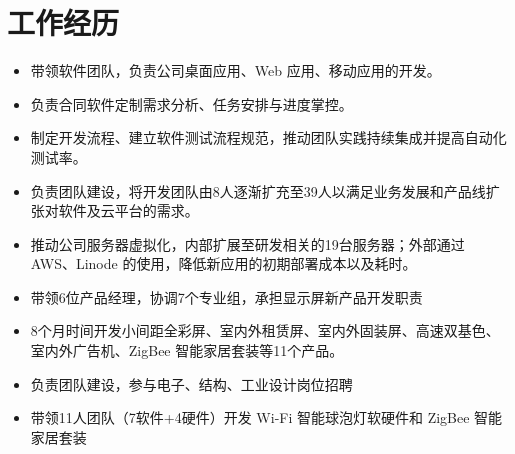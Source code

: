 \documentclass[11pt,a4paper]{moderncv/moderncv}
\begin{document}
\maketitle


\section{工作经历}

{
\begin{itemize}
	\item 带领软件团队，负责公司桌面应用、Web 应用、移动应用的开发。
	\item 负责合同软件定制需求分析、任务安排与进度掌控。
	\item 制定开发流程、建立软件测试流程规范，推动团队实践持续集成并提高自动化测试率。
	\item 负责团队建设，将开发团队由8人逐渐扩充至39人以满足业务发展和产品线扩张对软件及云平台的需求。
	\item 推动公司服务器虚拟化，内部扩展至研发相关的19台服务器；外部通过 AWS、Linode 的使用，降低新应用的初期部署成本以及耗时。
\end{itemize}
}

{
\begin{itemize}
	\item 带领6位产品经理，协调7个专业组，承担显示屏新产品开发职责
	\item 8个月时间开发小间距全彩屏、室内外租赁屏、室内外固装屏、高速双基色、室内外广告机、ZigBee 智能家居套装等11个产品。
	\item 负责团队建设，参与电子、结构、工业设计岗位招聘
\end{itemize}
}

{
\begin{itemize}
	\item 带领11人团队（7软件+4硬件）开发 Wi-Fi 智能球泡灯软硬件和 ZigBee 智能家居套装
\end{itemize}
}
\end{document}
